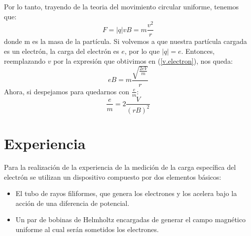 \documentclass[a4paper,12pt]{report}
\begin{document}
    Por lo tanto, trayendo de la teoria del movimiento circular uniforme, tenemos que:
    \begin{equation*}
        F = |q| v B = m \frac{v^2}{r}
    \end{equation*}
    donde m es la masa de la partícula. 
    Si volvemos a que nuestra partícula cargada es un electrón, la carga del electrón es $e$, por lo que $|q| = e$.
    Entonces, reemplazando $v$ por la expresión que obtivimos en (\ref{v.electron}), nos queda:
    \begin{equation*}
        e B = m \frac{\sqrt{\frac{2 eV}{m}}}{r}
    \end{equation*}
    Ahora, si despejamos para quedarnos con $\frac{e}{m}$:
    \begin{equation}
        \label{relac.e/m}
        \frac{e}{m} = 2 \frac{V}{(r B)^2}
    \end{equation}

\chapter{Experiencia}
    Para la realización de la experiencia de la medición de la carga específica del electrón se utilizan un dispositivo
    compuesto por dos elementos básicos:
    \begin{itemize}
        \item El tubo de rayos filiformes, que genera los electrones y los acelera bajo la acción de una diferencia de
            potencial.
        \item Un par de bobinas de Helmholtz encargadas de generar el campo magnético uniforme al cual serán sometidos
            los electrones.
    \end{itemize}
\end{document}
